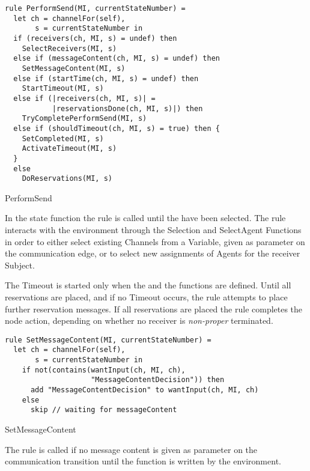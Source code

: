 \begin{listing}[H]
\begin{verbatim}
rule PerformSend(MI, currentStateNumber) =
  let ch = channelFor(self),
       s = currentStateNumber in
  if (receivers(ch, MI, s) = undef) then
    SelectReceivers(MI, s)
  else if (messageContent(ch, MI, s) = undef) then
    SetMessageContent(MI, s)
  else if (startTime(ch, MI, s) = undef) then
    StartTimeout(MI, s)
  else if (|receivers(ch, MI, s)| =
           |reservationsDone(ch, MI, s)|) then
    TryCompletePerformSend(MI, s)
  else if (shouldTimeout(ch, MI, s) = true) then {
    SetCompleted(MI, s)
    ActivateTimeout(MI, s)
  }
  else
    DoReservations(MI, s)
\end{verbatim}
\caption{PerformSend}
\label{lst:shortasm:PerformSend}
\end{listing}


In the state function the  rule is called until
the  have been selected. The  rule
interacts with the environment through the Selection and SelectAgent Functions
in order to either select existing Channels from a Variable, given as parameter
on the communication edge, or to select new assignments of Agents for the receiver
Subject.

The Timeout is started only when the  and the
 functions are defined. Until all reservations are
placed, and if no Timeout occurs, the  rule attempts
to place further reservation messages. If all reservations are placed the
 rule completes the node action, depending
on whether no receiver is \textit{non-proper} terminated.


\begin{listing}[H]
\begin{verbatim}
rule SetMessageContent(MI, currentStateNumber) =
  let ch = channelFor(self),
       s = currentStateNumber in
    if not(contains(wantInput(ch, MI, ch),
                    "MessageContentDecision")) then
      add "MessageContentDecision" to wantInput(ch, MI, ch)
    else
      skip // waiting for messageContent
\end{verbatim}
\caption{SetMessageContent}
\label{lst:shortasm:SetMessageContent}
\end{listing}



The  rule is called if no message content is
given as parameter on the communication transition until the 
function is written by the environment.





